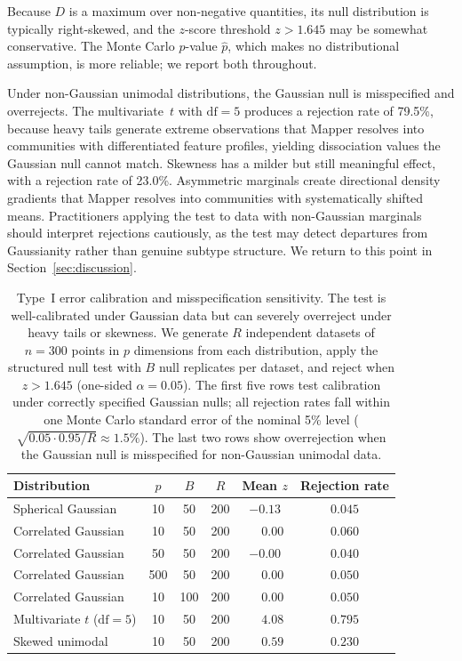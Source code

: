 \documentclass[hidelinks]{siamart251216}
\begin{document}
Because $D$ is a maximum over non-negative quantities, its null
distribution is typically right-skewed, and the $z$-score threshold
$z > 1.645$ may be somewhat conservative.  The Monte Carlo $p$-value
$\hat{p}$, which makes no distributional assumption, is more reliable;
we report both throughout.

Under non-Gaussian unimodal distributions, the Gaussian null is
misspecified and overrejects.  The multivariate~$t$ with
$\mathrm{df} = 5$ produces a rejection rate of 79.5\%, because heavy
tails generate extreme observations that Mapper resolves into
communities with differentiated feature profiles, yielding dissociation
values the Gaussian null cannot match.  Skewness has a milder but
still meaningful effect, with a rejection rate of 23.0\%.  Asymmetric
marginals create directional density gradients that Mapper resolves
into communities with systematically shifted means.  Practitioners applying the test to
data with non-Gaussian marginals should interpret rejections
cautiously, as the test may detect departures from Gaussianity rather
than genuine subtype structure.  We return to this point in
Section~\ref{sec:discussion}.

\begin{table}[t]
\caption{Type~I error calibration and misspecification sensitivity.
The test is well-calibrated under Gaussian data but can severely
overreject under heavy tails or skewness.
We generate $R$ independent datasets of $n = 300$ points in $p$
dimensions from each distribution, apply the structured null test with
$B$ null replicates per dataset, and reject when $z > 1.645$
(one-sided $\alpha = 0.05$).  The first five rows test calibration
under correctly specified Gaussian nulls; all rejection rates fall
within one Monte Carlo standard error of the nominal 5\% level
($\sqrt{0.05 \cdot 0.95 / R} \approx 1.5\%$).  The last two rows
show overrejection when the Gaussian null is misspecified for
non-Gaussian unimodal data.}
\label{tab:sim-typeI}
\begin{tabular}{@{}lccccc@{}}
\toprule
\textbf{Distribution} & $p$ & $B$ & $R$ & \textbf{Mean} $z$ & \textbf{Rejection rate} \\
\midrule
Spherical Gaussian      & 10  & 50  & 200 & $-0.13$ & $0.045$ \\
Correlated Gaussian     & 10  & 50  & 200 & $\phantom{-}0.00$  & $0.060$ \\
Correlated Gaussian     & 50  & 50  & 200 & $-0.00$ & $0.040$ \\
Correlated Gaussian     & 500 & 50  & 200 & $\phantom{-}0.00$ & $0.050$ \\
Correlated Gaussian     & 10  & 100 & 200 & $\phantom{-}0.00$ & $0.050$ \\
\midrule
Multivariate $t$ ($\mathrm{df}=5$) & 10  & 50  & 200 & $\phantom{-}4.08$  & $0.795$ \\
Skewed unimodal         & 10  & 50  & 200 & $\phantom{-}0.59$  & $0.230$ \\
\bottomrule
\end{tabular}
\end{table}
\end{document}
